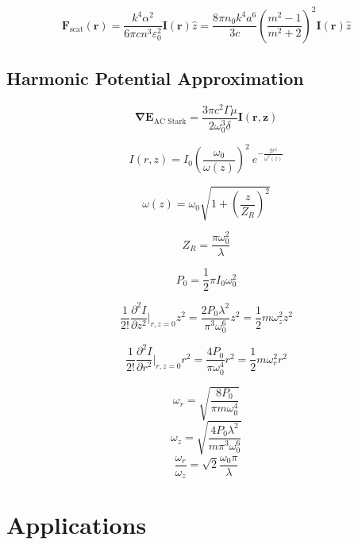 \documentclass{article}
\newcommand{\p}{\partial}
\begin{document}
\[ \mathbf{F}_\text{scat}(\mathbf{r}) = \frac{k^4\alpha^2}{6\pi cn^3\varepsilon_0^2}\mathbf{I}(\mathbf{r})\hat{z} = \frac{8\pi n_0k^4a^6}{3c}\left( \frac{m^2-1}{m^2+2} \right)^2\mathbf{I}(\mathbf{r})\hat{z}  \]

\subsection*{Harmonic Potential Approximation}

\[ \mathbf{\nabla E}_\text{AC Stark} = \frac{3\pi c^2\Gamma\mu}{2\omega_0^3\delta}\mathbf{I(r,z)}  \]

\[ I(r,z) = I_0 \left( \frac{\omega_0}{\omega(z)} \right)^2\ e^{\displaystyle -\frac{2r^2}{\omega^2(z)}}  \]

\[ \omega(z) = \omega_0 \sqrt{1 + \left( \frac{z}{Z_R} \right)^2} \]

\[ Z_R = \frac{\pi\omega_0^2}{\lambda}  \]

\[ P_0 = \frac{1}{2} \pi I_0\omega_0^2 \]

\[ \frac{1}{2!}\frac{\p^2I}{\p z^2} \Bigg\vert_{r,z=0} z^2 = \frac{2P_0\lambda^2}{\pi^3\omega_0^6}z^2 = \frac{1}{2}m\omega_z^2z^2  \]

\[ \frac{1}{2!}\frac{\p^2I}{\p r^2} \Bigg\vert_{r,z=0} r^2 = \frac{4P_0}{\pi\omega_0^4}r^2 = \frac{1}{2}m\omega_r^2r^2  \]

\[ \omega_r = \sqrt{\frac{8P_0}{\pi m\omega_0^4}} \]
\[ \omega_z = \sqrt{\frac{4P_0\lambda^2}{m\pi^3\omega_0^6}} \]
\[ \frac{\omega_r}{\omega_z} = \sqrt{2}\frac{\omega_0\pi}{\lambda}  \]





\section*{Applications}





\newpage



\end{document}
